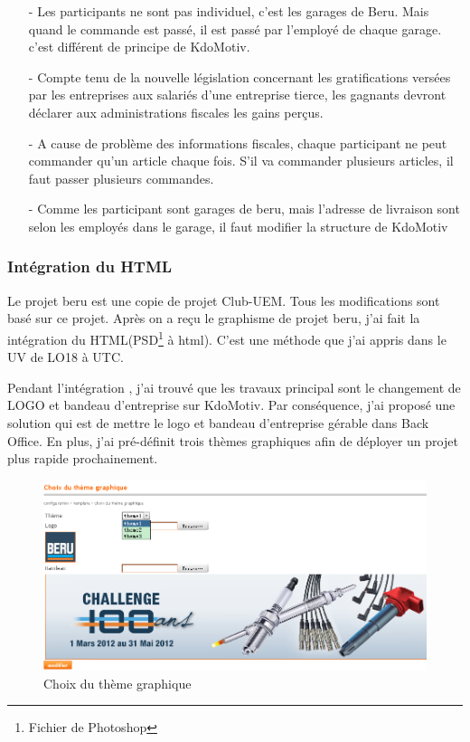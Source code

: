 \begin{itemize}
\item [-] Les participants ne sont pas individuel, c'est les garages de Beru. Mais quand le commande est passé, il est passé par l'employé de chaque garage. c'est différent de principe de KdoMotiv.
\item [-] Compte tenu de la nouvelle législation concernant les gratifications versées par les entreprises aux salariés d'une entreprise tierce, les gagnants devront déclarer aux administrations fiscales les gains perçus. 
\item [-] A cause de problème des informations fiscales, chaque participant ne peut commander qu'un article chaque fois. S'il va commander plusieurs articles, il faut passer plusieurs commandes.
\item [-] Comme les participant sont garages de beru, mais l'adresse de livraison sont selon les employés dans le garage, il faut modifier la structure de KdoMotiv 
\end{itemize}

\subsubsection{Intégration du HTML}
Le projet beru est une copie de projet Club-UEM. Tous les modifications sont basé sur ce projet. Après on a reçu le graphisme de projet beru, j'ai fait la intégration du HTML(PSD\footnote{Fichier de Photoshop} à html). C'est une  méthode que j'ai appris dans le UV de LO18 à UTC.  

Pendant l'intégration , j'ai trouvé que les travaux principal sont le changement de LOGO et bandeau d'entreprise sur KdoMotiv. Par conséquence, j'ai proposé une solution qui est de mettre le logo et bandeau d'entreprise gérable dans Back Office. En plus, j'ai pré-définit trois thèmes graphiques afin de déployer un projet plus rapide prochainement.

\begin{figure}[hbtp]
\centering
\includegraphics[width=16cm]{body/images/template-theme.png}
\caption{Choix du thème graphique}
\end{figure}
 



